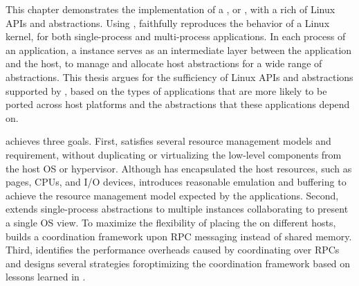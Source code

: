 
This chapter demonstrates the implementation of a \libos{}, or \thelibos{}, with a rich of Linux APIs and abstractions.
Using \thehostabi{},
\thelibos{} faithfully reproduces the behavior of a Linux kernel,
for both single-process and multi-process applications.
In each process of an application,
a \thelibos{} instance serves as an intermediate layer
between the application and the host,
to manage and allocate host abstractions for a wide range of \libos{} abstractions.
This thesis argues for the sufficiency of Linux APIs and abstractions
supported by \thelibos{},
based on the types of applications that are more likely to be ported across host platforms and the abstractions that these applications depend on.


\thelibos{} achieves three goals.
First, \thelibos{} satisfies
several resource management models and requirement, without duplicating or virtualizing the low-level components from the host OS or hypervisor.
Although \thehostabi{} has encapsulated the host resources,
such as pages, CPUs, and I/O devices,
\thelibos{} introduces reasonable emulation and buffering to achieve the resource management model expected by the applications.
Second, \thelibos{} extends single-process abstractions
to multiple \thelibos{} instances collaborating to present a single OS view.
To maximize the flexibility of placing the \picoprocs{}
on different hosts,
\thelibos{} builds a coordination framework upon RPC messaging instead of shared memory.
Third, \thelibos{} identifies the performance overheads
caused by coordinating over RPCs 
and designs several strategies foroptimizing the coordination framework
based on lessons learned in \graphene{}.


